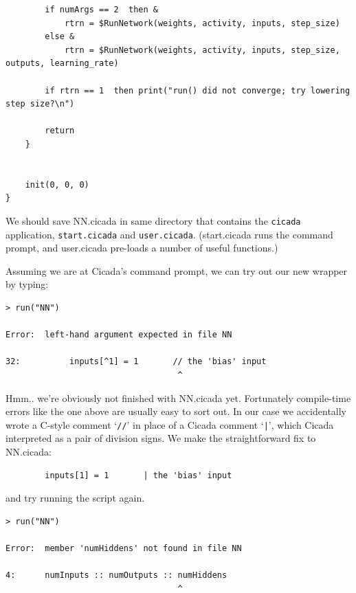 \documentclass{article}
\newenvironment{code}{
       \begin{list}{}{
               \setlength{\leftmargin}{.4in}
               \setlength{\rightmargin}{0in}
               \setlength{\topsep}{.2in}
       }
       \small
       \item[] }
       { \end{list}   }
\newenvironment{longcode}{
       \begin{list}{}{
               \setlength{\leftmargin}{0in}
               \setlength{\rightmargin}{0in}
               \setlength{\topsep}{.2in}
       }
       \small
       \item[] }
       { \end{list}   }
\begin{document}
\begin{longcode}
\begin{verbatim}
        if numArgs == 2  then &
            rtrn = $RunNetwork(weights, activity, inputs, step_size)
        else &
            rtrn = $RunNetwork(weights, activity, inputs, step_size, outputs, learning_rate)
        
        if rtrn == 1  then print("run() did not converge; try lowering step size?\n")
        
        return
    }
    
    
    init(0, 0, 0)
}
\end{verbatim} \end{longcode}

\noindent We should save NN.cicada in same directory that contains the \verb#cicada# application, \verb#start.cicada# and \verb#user.cicada#.  (start.cicada runs the command prompt, and user.cicada pre-loads a number of useful functions.)

Assuming we are at Cicada's command prompt, we can try out our new wrapper by typing:

\begin{code} \begin{verbatim}
> run("NN")

Error:  left-hand argument expected in file NN

32:          inputs[^1] = 1       // the 'bias' input
                                   ^
\end{verbatim} \end{code}

\noindent Hmm..  we're obviously not finished with NN.cicada yet.  Fortunately compile-time errors like the one above are usually easy to sort out.  In our case we accidentally wrote a C-style comment `\verb#//#' in place of a Cicada comment `\verb#|#', which Cicada interpreted as a pair of division signs.  We make the straightforward fix to NN.cicada:

\begin{code} \begin{verbatim}
        inputs[1] = 1       | the 'bias' input
\end{verbatim} \end{code}

\noindent and try running the script again.

\begin{code} \begin{verbatim}
> run("NN")

Error:  member 'numHiddens' not found in file NN

4:      numInputs :: numOutputs :: numHiddens
                                   ^
\end{verbatim} \end{code}
\end{document}
